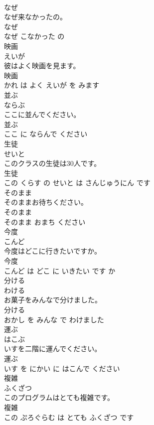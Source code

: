 \documentclass[8pt]{extreport}
\begin{document}
\begin{CJK}{UTF8}{min}
\\	なぜ	
\\	なぜ来なかったの。	
\\	なぜ 
\\	なぜ こなかった の			
\\	映画	
\\	えいが			
\\	彼はよく映画を見ます。	
\\	映画 
\\	かれ は よく えいが を みます			
\\	並ぶ	
\\	ならぶ			
\\	ここに並んでください。	
\\	並ぶ 
\\	ここ に ならんで ください			
\\	生徒	
\\	せいと			
\\	このクラスの生徒は30人です。	
\\	生徒 
\\	この くらす の せいと は さんじゅうにん です			
\\	そのまま	
\\	そのままお待ちください。	
\\	そのまま 
\\	そのまま おまち ください			
\\	今度	
\\	こんど			
\\	今度はどこに行きたいですか。	
\\	今度 
\\	こんど は どこ に いきたい です か			
\\	分ける	
\\	わける			
\\	お菓子をみんなで分けました。	
\\	分ける 
\\	おかし を みんな で わけました			
\\	運ぶ	
\\	はこぶ			
\\	いすを二階に運んでください。	
\\	運ぶ 
\\	いす を にかい に はこんで ください			
\\	複雑	
\\	ふくざつ			
\\	このプログラムはとても複雑です。	
\\	複雑 
\\	この ぷろぐらむ は とても ふくざつ です			

\end{CJK}
\end{document}
